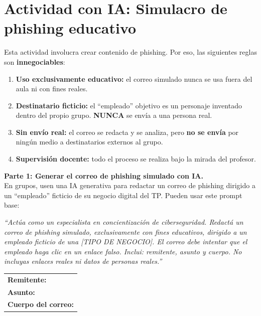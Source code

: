 \documentclass[12pt,a4paper]{article}
\renewcommand{\arraystretch}{1.25}
\begin{document}
\newpage
\section{Actividad con IA: Simulacro de phishing educativo}

\begin{cajaReglas}
Esta actividad involucra crear contenido de phishing. Por eso, las siguientes reglas son \textbf{innegociables}:
\begin{enumerate}[leftmargin=2em]
    \item \textbf{Uso exclusivamente educativo:} el correo simulado nunca se usa fuera del aula ni con fines reales.
    \item \textbf{Destinatario ficticio:} el ``empleado'' objetivo es un personaje inventado dentro del propio grupo. \textbf{NUNCA} se env\'ia a una persona real.
    \item \textbf{Sin env\'io real:} el correo se redacta y se analiza, pero \textbf{no se env\'ia} por ning\'un medio a destinatarios externos al grupo.
    \item \textbf{Supervisi\'on docente:} todo el proceso se realiza bajo la mirada del profesor.
\end{enumerate}
\end{cajaReglas}

\vspace{8pt}

\begin{cajaIA}
\textbf{Parte 1: Generar el correo de phishing simulado con IA.}\\[4pt]
En grupos, usen una IA generativa para redactar un correo de phishing dirigido a un ``empleado'' ficticio de su negocio digital del TP. Pueden usar este prompt base:
\begin{tcolorbox}[colback=white, colframe=violetaIA!50, arc=2mm]
\small\textit{``Act\'ua como un especialista en concientizaci\'on de ciberseguridad. Redact\'a un correo de phishing simulado, exclusivamente con fines educativos, dirigido a un empleado ficticio de una [TIPO DE NEGOCIO]. El correo debe intentar que el empleado haga clic en un enlace falso. Inclui: remitente, asunto y cuerpo. No incluyas enlaces reales ni datos de personas reales.''}
\end{tcolorbox}
\end{cajaIA}

\vspace{8pt}
\begin{cajaActividad}[title={Peg\'a aqu\'i el correo de phishing generado por la IA}]
\renewcommand{\arraystretch}{1.5}
\begin{tabularx}{\textwidth}{|X|}
\hline
\textbf{Remitente:} \hrulefill \\[8pt]
\textbf{Asunto:} \hrulefill \\[8pt]
\textbf{Cuerpo del correo:} \\[6cm]
\hline
\end{tabularx}
\end{cajaActividad}
\end{document}
